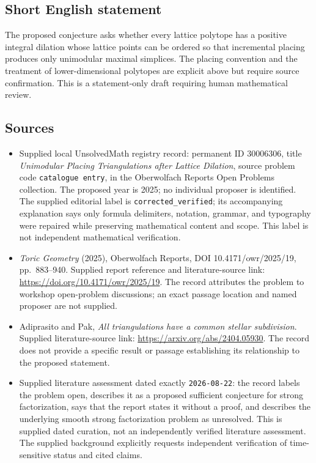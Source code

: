 \documentclass[11pt]{article}
\begin{document}
\subsection{Short English statement}
The proposed conjecture asks whether every lattice polytope has a positive integral dilation whose lattice points can be ordered so that incremental placing produces only unimodular maximal simplices. The placing convention and the treatment of lower-dimensional polytopes are explicit above but require source confirmation. This is a statement-only draft requiring human mathematical review.
\subsection{Sources}
\begin{itemize}
\item Supplied local UnsolvedMath registry record: permanent ID \(30006306\), title \emph{Unimodular Placing Triangulations after Lattice Dilation}, source problem code \texttt{catalogue entry}, in the Oberwolfach Reports Open Problems collection. The proposed year is 2025; no individual proposer is identified. The supplied editorial label is \texttt{corrected\_verified}; its accompanying explanation says only formula delimiters, notation, grammar, and typography were repaired while preserving mathematical content and scope. This label is not independent mathematical verification.
\item \emph{Toric Geometry} (2025), Oberwolfach Reports, DOI 10.4171/owr/2025/19, pp.\ 883--940. Supplied report reference and literature-source link: \url{https://doi.org/10.4171/owr/2025/19}. The record attributes the problem to workshop open-problem discussions; an exact passage location and named proposer are not supplied.
\item Adiprasito and Pak, \emph{All triangulations have a common stellar subdivision}. Supplied literature-source link: \url{https://arxiv.org/abs/2404.05930}. The record does not provide a specific result or passage establishing its relationship to the proposed statement.
\item Supplied literature assessment dated exactly \texttt{2026-08-22}: the record labels the problem open, describes it as a proposed sufficient conjecture for strong factorization, says that the report states it without a proof, and describes the underlying smooth strong factorization problem as unresolved. This is supplied dated curation, not an independently verified literature assessment. The supplied background explicitly requests independent verification of time-sensitive status and cited claims.
\end{itemize}
\end{document}
